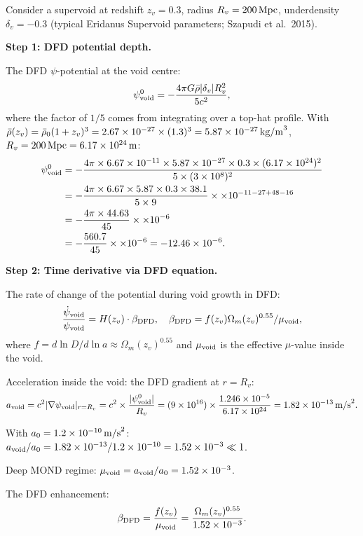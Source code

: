 \documentclass[11pt]{article}
\newcommand{\ee}[1]{\times 10^{#1}}
\newcommand{\mufd}{\mu}
\newcommand{\DFD}{{\rm DFD}}
\begin{document}
Consider a supervoid at redshift $z_v = 0.3$, radius $R_v = 200\,{\rm Mpc}$,
underdensity $\delta_v = -0.3$ (typical Eridanus Supervoid parameters;
Szapudi et al.\ 2015).

\textbf{Step 1: DFD potential depth.}

The DFD $\psi$-potential at the void centre:
\begin{equation}
  \psi_{\rm void}^0 = -\frac{4\pi G\bar\rho|\delta_v|R_v^2}{5c^2},
\end{equation}
where the factor of $1/5$ comes from integrating over a top-hat profile.
With $\bar\rho(z_v) = \bar\rho_0(1+z_v)^3 = 2.67\ee{-27}\times(1.3)^3
= 5.87\ee{-27}\,{\rm kg/m}^3$, $R_v = 200\,{\rm Mpc} = 6.17\ee{24}\,{\rm m}$:
\begin{align}
  \psi_{\rm void}^0 &= -\frac{4\pi\times 6.67\ee{-11}\times 5.87\ee{-27}
  \times 0.3\times(6.17\ee{24})^2}{5\times(3\ee{8})^2} \nonumber\\
  &= -\frac{4\pi\times 6.67\times 5.87\times 0.3\times 38.1}{5\times 9}
  \times\ee{-11-27+48-16} \nonumber\\
  &= -\frac{4\pi\times 44.63}{45}\times\ee{-6} \nonumber\\
  &= -\frac{560.7}{45}\times\ee{-6} = -12.46\ee{-6}.
\end{align}

\textbf{Step 2: Time derivative via DFD equation.}

The rate of change of the potential during void growth in DFD:
\begin{equation}
  \frac{\dot\psi_{\rm void}}{\psi_{\rm void}} = H(z_v)\cdot\beta_\DFD,
  \quad \beta_\DFD = f(z_v)\Omega_m(z_v)^{0.55}/\mufd_{\rm void},
\end{equation}
where $f = d\ln D/d\ln a \approx \Omega_m(z_v)^{0.55}$ and $\mufd_{\rm void}$
is the effective $\mu$-value inside the void.

Acceleration inside the void: the DFD gradient at $r = R_v$:
\begin{equation}
  a_{\rm void} = c^2|\nabla\psi_{\rm void}|_{r=R_v}
  = c^2 \times \frac{|\psi_{\rm void}^0|}{R_v}
  = (9\ee{16})\times\frac{1.246\ee{-5}}{6.17\ee{24}}
  = 1.82\ee{-13}\,{\rm m/s}^2.
\end{equation}

With $a_0 = 1.2\ee{-10}\,{\rm m/s}^2$: $a_{\rm void}/a_0 = 1.82\ee{-13}/1.2\ee{-10}
= 1.52\ee{-3} \ll 1$.

Deep MOND regime: $\mufd_{\rm void} = a_{\rm void}/a_0 = 1.52\ee{-3}$.

The DFD enhancement:
\begin{equation}
  \beta_\DFD = \frac{f(z_v)}{\mufd_{\rm void}}
  = \frac{\Omega_m(z_v)^{0.55}}{1.52\ee{-3}}.
\end{equation}
\end{document}
